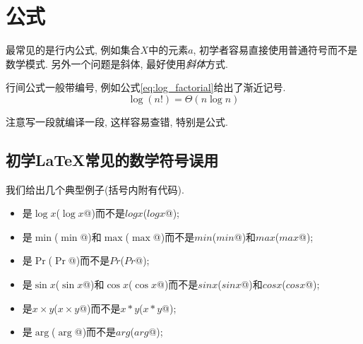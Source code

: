 \chapter{公式}

  最常见的是行内公式, 例如集合$X$中的元素$a$, 初学者容易直接使用普通符号而不是数学模式.
另外一个问题是斜体, 最好使用\emph{斜体}方式.

  行间公式一般带编号, 例如公式\eqref{eq:log_factorial}给出了渐近记号.
\begin{equation}
\label{eq:log_factorial}
\log(n!) = \Theta(n\log{n})
\end{equation}

  注意写一段就编译一段, 这样容易查错, 特别是公式.

\section{初学\LaTeX{}常见的数学符号误用}

  我们给出几个典型例子(括号内附有代码).
\begin{itemize}
  \item 是$\log{x}$(\verb@$\log{}x$@)而不是$log x$(\verb@$log x$@);
  \item 是$\min$(\verb@$\min$@)和$\max$(\verb@$\max$@)而不是$min$(\verb@$min$@)和$max$(\verb@$max$@);
  \item 是$\Pr$(\verb@$\Pr$@)而不是$Pr$(\verb@$Pr$@);
  \item 是$\sin{x}$(\verb@$\sin{}x$@)和$\cos{x}$(\verb@$\cos{}x$@)而不是$sin{x}$(\verb@$sin x$@)和$cos x$(\verb@$cos{x}$@);
  \item 是$x \times y$(\verb@$x \times y$@)而不是$x * y$(\verb@$x * y$@);
  \item 是$\arg$(\verb@$\arg$@)而不是$arg$(\verb@$arg$@);
\end{itemize}
